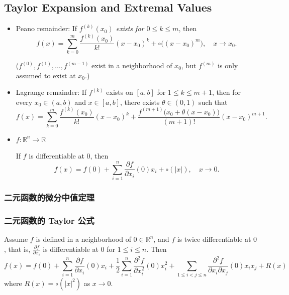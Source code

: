 \subsection[多变量函数的 Taylor 公式与极值]{Taylor Expansion and Extremal Values}

\begin{itemize}
    \item Peano remainder: If \emph{$f^{(k)}(x_0)$ exists for $0\leq k\leq m$}, then
          $$
              f(x)=\sum_{k=0}^m\frac{f^{(k)}(x_0)}{k!}(x-x_0)^k+\circ\bigl((x-x_0)^m\bigr),\quad x\to x_0.
          $$

          ($f^{(0)},f^{(1)},\dots,f^{(m-1)}$ exist in a neighborhood of $x_0$, but $f^{(m)}$ is only assumed to exist at $x_0$.)
    \item Lagrange remainder: If $f^{(k)}$ exists on $[a,b]$ for $1\leq k\leq m+1$, then for every $x_0\in(a,b)$ and $x\in[a,b]$, there exists $\theta\in(0,1)$ such that
          $$
              f(x)=\sum_{k=0}^m\frac{f^{(k)}(x_0)}{k!}(x-x_0)^k+\frac{f^{(m+1)}\bigl(x_0+\theta(x-x_0)\bigr)}{(m+1)!}(x-x_0)^{m+1}.
          $$
    \item $f:\mathbb{R}^n\to\mathbb{R}$

          If $f$ is differentiable at $0$, then
          $$
              f(x)=f(0)+\sum_{i=1}^n\frac{\partial f}{\partial x_i}(0)x_i+\circ(|x|),\quad x\to 0.
          $$
\end{itemize}

\subsubsection{二元函数的微分中值定理}

\subsubsection{二元函数的 Taylor 公式}

\begin{theorem}
    Assume $f$ is defined in a neighborhood of $0\in\mathbb{R}^n$, and $f$ is twice differentiable at $0$, that is, $\frac{\partial f}{\partial x_i}$ is differentiable at $0$ for $1\leq i\leq n$. Then
    $$f(x)=\boxed{f(0)+\sum_{i=1}^n\frac{\partial f}{\partial x_i}(0)x_i+\frac{1}{2}\sum_{i=1}^n\frac{\partial^2 f}{\partial x_i^2}(0)x_i^2+\sum_{1\leq i<j\leq n}\frac{\partial^2 f}{\partial x_i\partial x_j}(0)x_ix_j}+R(x)$$
    where $R(x)=\circ(|x|^2)$ as $x\to 0$.
\end{theorem}

